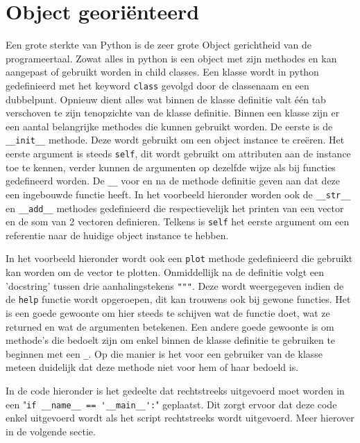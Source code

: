 \documentclass[11pt,twoside]{article}
\begin{document}
	\section{Object georiënteerd} 
Een grote sterkte van Python is de zeer grote Object gerichtheid van de programeertaal. Zowat alles in python is een object met zijn methodes en kan aangepast of gebruikt worden in child classes. Een klasse wordt in python gedefinieerd met het keyword \lstinline{class} gevolgd door de classenaam en een dubbelpunt. Opnieuw dient alles wat binnen de klasse definitie valt één tab verschoven te zijn tenopzichte van de klasse definitie. Binnen een klasse zijn er een aantal belangrijke methodes die kunnen gebruikt worden. De eerste is de \lstinline{__init__} methode. Deze wordt gebruikt om een object instance te creëren. Het eerste argument is steeds \lstinline{self}, dit wordt gebruikt om attributen aan de instance toe te kennen, verder kunnen de argumenten op dezelfde wijze als bij functies gedefineerd worden. De \lstinline{__} voor en na de methode definitie geven aan dat deze een ingebouwde functie heeft. In het voorbeeld hieronder worden ook de \lstinline{__str__} en \lstinline{__add__} methodes gedefinieerd die respectievelijk het printen van een vector en de som van 2 vectoren definieren. Telkens is \lstinline{self} het eerste argument om een referentie naar de huidige object instance te hebben.

In het voorbeeld hieronder wordt ook een \lstinline{plot} methode gedefinieerd die gebruikt kan worden om de vector te plotten. Onmiddellijk na de definitie volgt een 'docstring' tussen drie aanhalingstekens \lstinline{"""}. Deze wordt weergegeven indien de de \lstinline{help} functie wordt opgeroepen, dit kan trouwens ook bij gewone functies. Het is een goede gewoonte om hier steeds te schijven wat de functie doet, wat ze returned en wat de argumenten betekenen. Een andere goede gewoonte is om methode's die bedoelt zijn om enkel binnen de klasse definitie te gebruiken te beginnen met een \lstinline{_}. Op die manier is het voor een gebruiker van de klasse meteen duidelijk dat deze methode niet voor hem of haar bedoeld is. 

In de code hieronder is het gedeelte dat rechtstreeks uitgevoerd moet worden in een "\lstinline{if __name__ == '__main__':}" geplaatst. Dit zorgt ervoor dat deze code enkel uitgevoerd wordt als het script rechtstreeks wordt uitgevoerd. Meer hierover in de volgende sectie.

	
\end{document}
